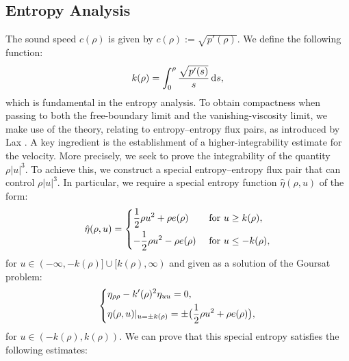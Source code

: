 \documentclass[reqno,11pt]{amsart}
\numberwithin{equation}{section}
\theoremstyle{definition}
\def\dd{{\, \rm d}}
\begin{document}
\subsection{Entropy Analysis}
The sound speed $c(\rho)$ is given by $c(\rho):= \sqrt{p'(\rho)}$. 
We define the following function:
\[
    k(\rho) = \int^\rho_0 \frac{\sqrt{p'(s)}}{s} \dd s,
\]
which is fundamental in the entropy analysis. 
To obtain compactness when passing to both the free-boundary limit and the vanishing-viscosity limit, 
we make use of the theory, relating to entropy–entropy flux pairs, as introduced by Lax \cite{Lax}. 
A key ingredient is the establishment of a higher-integrability estimate 
for the velocity. More precisely, we seek to prove the integrability of the quantity $\rho|u|^3$.
To achieve this, we construct a special entropy–entropy flux pair that can control 
$\rho|u|^3$. In particular, we require a special entropy function 
$\hat{\eta}(\rho,u)$ of the form:
\begin{equation*}
    \hat{\eta}(\rho,u) =
    \begin{dcases}
  \frac{1}{2}\rho u^2 + \rho e(\rho) & \text{ for } u \geq k(\rho), \\
 -\frac{1}{2}\rho u^2 - \rho e(\rho) & \text{ for } u \leq -k(\rho),
    \end{dcases}
\end{equation*}
for $u \in (-\infty,-k(\rho)] \cup [k(\rho),\infty)$ and given as a solution of the Goursat problem:
\begin{equation}\label{Goursat}
    \begin{dcases}
 \eta_{\rho \rho} - k'(\rho)^2 \eta_{u u} = 0, \\
 \eta(\rho,u)|_{u = \pm k(\rho)} = \pm \big(\frac{1}{2}\rho u^2 + \rho e(\rho)\big),
    \end{dcases}
\end{equation}
for $u \in (-k(\rho),k(\rho))$. We can prove that this special entropy satisfies the following estimates:
\end{document}
